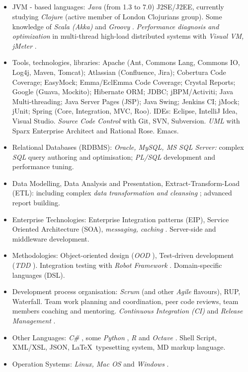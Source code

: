 \documentclass{res}
\newcommand{\osection}[1]{\section{\sc {\Large \textbf{#1}\\}} \vspace{0.30cm}}
\newcommand{\profileItem}[2]{\item {\sc #1:} #2.}
\newcommand{\emp}[1]{{\em #1 }}
\newif\ifFullVersion
\begin{document}
\begin{resume}
\osection{Technical Profile}
\begin{itemize}
\ifFullVersion
  \profileItem {Full software development lifecycle (SLDC)} {requirement gathering and analysis, design, prototyping, implementation, performance tuning, quality assurance (QA) organisation, release management}
  \profileItem {Development process organisation} {\emp{Scrum} (and other \emp{Agile} flavours), RUP, Waterfall. Team work planning and coordination, peer code reviews, team members coaching and mentoring. \emp{Continuous Integration (CI)} and \emp{Release Management}}
\fi
  \profileItem {JVM - based languages} {\emp{Java} (from 1.3 to 7.0) J2SE/J2EE, currently studying \emp{Clojure} (active member of London Clojurians group). Some knowledge of \emp{Scala (Akka)} and \emp{Groovy}. \emp{Performance diagnosis and optimization} in multi-thread high-load distributed systems with \emp{Visual VM, jMeter}}
  \profileItem {Tools, technologies, libraries} {Apache (Ant, Commons Lang, Commons IO, Log4j, Maven, Tomcat); Atlassian (Confluence, Jira); Cobertura Code Coverage; EasyMock; Emma/EclEmma Code Coverage; Crystal Reports; Google (Guava, Mockito); Hibernate ORM; JDBC; jBPM/Activiti; Java Multi-threading; Java Server Pages (JSP); Java Swing; Jenkins CI; jMock; jUnit; Spring (Core, Integration, MVC, Roo). IDEs: Eclipse, IntelliJ Idea, Visual Studio. \emp{Source Code Control} with Git, SVN, Subversion. \emp{UML} with Sparx Enterprise Architect and Rational Rose. Emacs}
  \profileItem {Relational Databases (RDBMS)} {\emp{Oracle, MySQL, MS SQL Server:} complex \emp{SQL} query authoring and optimisation; \emp{PL/SQL} development and performance tuning}
  \profileItem{Data Modelling, Data Analysis and Presentation, Extract-Transform-Load (ETL)} {including complex \emp{data transformation and cleansing}; advanced report building}
  \profileItem{Enterprise Technologies} {Enterprise Integration patterns (EIP), Service Oriented Architecture (SOA), \emp{messaging, caching}. Server-side and middleware development}
  \profileItem{Methodologies} {Object-oriented design (\emp{OOD}), Test-driven development (\emp{TDD}). Integration testing with \emp{Robot Framework}. Domain-specific languages (DSL)}
\ifFullVersion
Strong interest in \emp{functional programming}, Data Science and Machine Learning / Business Intelligence systems.
\else
  \profileItem{Development process organisation} {\emp{Scrum} (and other \emp{Agile} flavours), RUP, Waterfall. Team work planning and coordination, peer code reviews, team members coaching and mentoring. \emp{Continuous Integration (CI)} and \emp{Release Management}}
\fi
  \profileItem{Other Languages} {\emp{C\#}, some \emp{Python}, \emp{R} and \emp{Octave}. Shell Script, XML/XSL, JSON, \LaTeX ~typesetting system, MD markup language}
  \profileItem{Operation Systems} {\emp{Linux, Mac OS} and \emp{Windows}}
\end{itemize}


\end{resume}
\end{document}
